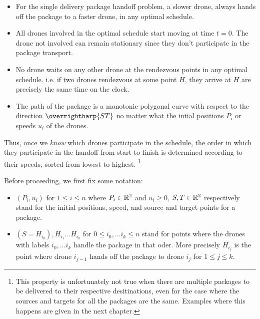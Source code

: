 \documentclass[12.0pt]{report}
\begin{document}
\begin{flem}

\begin{itemize}

   \item  For the single delivery package handoff problem,  a slower drone, 
          always hands off the package to a faster drone, in any optimal schedule. 
   
    \item All drones involved in the optimal schedule start moving at time $t=0$. The drone not involved 
          can remain stationary since they don't participate in the package transport. 
     
    \item No drone waits on any other drone at the rendezvous points in any optimal schedule. i.e. if two drones rendezvous at some 
          point $H$, they arrive at $H$ are precisely the same time on the clock. 

    \item The path of the package is a monotonic polygonal curve with respect to the direction $\overrightharp{ST}$
          no matter what the intial positions $P_i$ or speeds $u_i$ of the drones. 
\end{itemize}  


 \end{flem}

Thus, once we \textit{know} which drones participate in the schedule, the order in which they participate in the handoff
from start to finish is determined according to their speeds, sorted from lowest to highest. \footnote{This property is unfortunately 
not true when there are multiple packages to be delivered to their respective desitinations, even for the case where the sources
and targets for all the packages are the same. Examples where this happens are given in the next chapter.}

Before proceeding, we first fix some notation: 

\begin{itemize}
\item $(P_i, u_i)$ for $1 \leq i \leq n$ where $P_i \in \mathbb{R}^2$ and $u_i \geq 0$, $S,T \in \mathbb{R}^2$ respectively stand for the initial positions, speed, and source and target points for a package. 
\item $(S=H_{i_0}), H_{i_1} \ldots H_{i_k}$ for $0 \leq i_0, \ldots i_k \leq n$ stand for points where the drones with labels $i_0, \ldots i_k$ handle the package in that oder. More precisely 
      $H_{i_j}$ is the point where drone $i_{j-1}$ hands off the package to drone $i_j$ for $1 \leq j \leq k$.  
\end{itemize}
\end{document}
